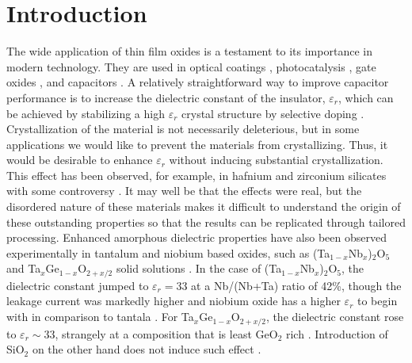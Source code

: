 \section{Introduction} 
The wide application of thin film oxides is a testament to its importance in modern technology. They are used in optical coatings \cite{Cevro1995}, photocatalysis \cite{Fujishima1972}, gate oxides \cite{Wilk2000a}, and capacitors \cite{Kim2008}. A relatively straightforward way to improve capacitor performance is to increase the dielectric constant of the insulator, $\varepsilon_{r}$, which can be achieved by stabilizing a high $\varepsilon_{r}$ crystal structure by selective doping \cite{Govindarajan2007, Chalker2008, TsouTsou2009, Tomida2006}. Crystallization of the material is not necessarily deleterious, but in some applications we would like to prevent the materials from crystallizing. Thus, it would be desirable to enhance $\varepsilon_{r}$ without inducing substantial crystallization. This effect has been observed, for example, in hafnium and zirconium silicates with some controversy \cite{Wilk2000a, Lucovsky2000, Pignedoli2007}. It may well be that the effects were real, but the disordered nature of these materials makes it difficult to understand the origin of these outstanding properties so that the results can be replicated through tailored processing. Enhanced amorphous dielectric properties have also been observed experimentally in tantalum and niobium based oxides, such as (Ta$_{1-x}$Nb$_{x}$)$_{2}$O$_{5}$ and Ta$_{x}$Ge$_{1-x}$O$_{2+x/2}$ solid solutions \cite{Kukli1999,Naoi2012}. In the case of (Ta$_{1-x}$Nb$_{x}$)$_{2}$O$_{5}$, the dielectric constant jumped to $\varepsilon_{r} = 33$ at a Nb/(Nb+Ta) ratio of 42\%, though the leakage current was markedly higher and niobium oxide has a higher $\varepsilon_{r}$ to begin with in comparison to tantala \cite{Kukli1999}. For Ta$_{x}$Ge$_{1-x}$O$_{2+x/2}$, the dielectric constant rose to $\varepsilon_{r} \sim 33$, strangely at a composition that is least GeO$_{2}$ rich \cite{Naoi2012}. Introduction of SiO$_{2}$ on the other hand does not induce such effect \cite{Naoi2018jap}.

